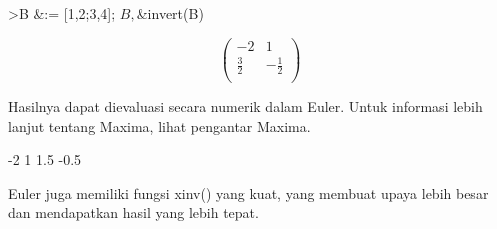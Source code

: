 \documentclass[a4paper,10pt]{article}
\begin{document}
\begin{eulernotebook}
\begin{eulercomment}
\begin{eulercomment}
\begin{eulercomment}
\begin{eulercomment}
\begin{eulercomment}
\begin{eulercomment}
\begin{eulerttcomment}
\end{eulerttcomment}
\begin{eulerprompt}
>B &:= [1,2;3,4]; $B, $&invert(B)
\end{eulerprompt}
\begin{eulerformula}
\[
\begin{pmatrix}-2 & 1 \\ \frac{3}{2} & -\frac{1}{2} \\   \end{pmatrix}
\]
\end{eulerformula}
\begin{eulercomment}
Hasilnya dapat dievaluasi secara numerik dalam Euler. Untuk informasi
lebih lanjut tentang Maxima, lihat pengantar Maxima.
\end{eulercomment}
\begin{euleroutput}
             -2             1 
            1.5          -0.5 
\end{euleroutput}
\begin{eulercomment}
Euler juga memiliki fungsi xinv() yang kuat, yang membuat upaya lebih
besar dan mendapatkan hasil yang lebih tepat.


\end{eulercomment}
\end{eulercomment}
\end{eulercomment}
\end{eulercomment}
\end{eulercomment}
\end{eulercomment}
\end{eulercomment}
\end{eulernotebook}
\end{document}
